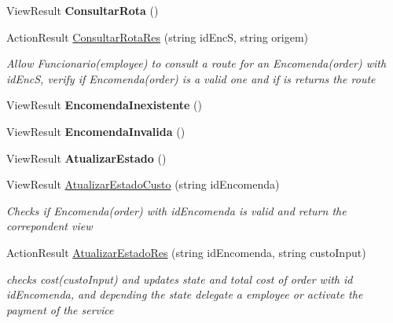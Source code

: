 \begin{DoxyCompactItemize}
\mbox{\label{classmvc_j_j_m_s_1_1_controllers_1_1_menu_funcionario_controller_a579dc46926cba210b05c6b3dca4061a5}} 
View\+Result {\bfseries Consultar\+Rota} ()
\item 
Action\+Result \mbox{\hyperlink{classmvc_j_j_m_s_1_1_controllers_1_1_menu_funcionario_controller_a6b3d80d3a3c8ec6cffddf1a21ca6606f}{Consultar\+Rota\+Res}} (string id\+EncS, string origem)
\begin{DoxyCompactList}\small\item\em Allow Funcionario(employee) to consult a route for an Encomenda(order) with id\+EncS, verify if Encomenda(order) is a valid one and if is returns the route \end{DoxyCompactList}\item 
\mbox{\label{classmvc_j_j_m_s_1_1_controllers_1_1_menu_funcionario_controller_a79f757c8123a389769358fa4a39011fd}} 
View\+Result {\bfseries Encomenda\+Inexistente} ()
\item 
\mbox{\label{classmvc_j_j_m_s_1_1_controllers_1_1_menu_funcionario_controller_a2144dac1033881d1b96d2a2f24308104}} 
View\+Result {\bfseries Encomenda\+Invalida} ()
\item 
\mbox{\label{classmvc_j_j_m_s_1_1_controllers_1_1_menu_funcionario_controller_a2b03ef8c9cf04a249eced8f43ae34d04}} 
View\+Result {\bfseries Atualizar\+Estado} ()
\item 
View\+Result \mbox{\hyperlink{classmvc_j_j_m_s_1_1_controllers_1_1_menu_funcionario_controller_ad45a069bdf6baf93b0851b7eef2d9088}{Atualizar\+Estado\+Custo}} (string id\+Encomenda)
\begin{DoxyCompactList}\small\item\em Checks if Encomenda(order) with id\+Encomenda is valid and return the correpondent view \end{DoxyCompactList}\item 
Action\+Result \mbox{\hyperlink{classmvc_j_j_m_s_1_1_controllers_1_1_menu_funcionario_controller_a9eaa1e9f78c031cb0431158442e5f0c2}{Atualizar\+Estado\+Res}} (string id\+Encomenda, string custo\+Input)
\begin{DoxyCompactList}\small\item\em checks cost(custo\+Input) and updates state and total cost of order with id id\+Encomenda, and depending the state delegate a employee or activate the payment of the service \end{DoxyCompactList}\item 

\end{DoxyCompactItemize}
